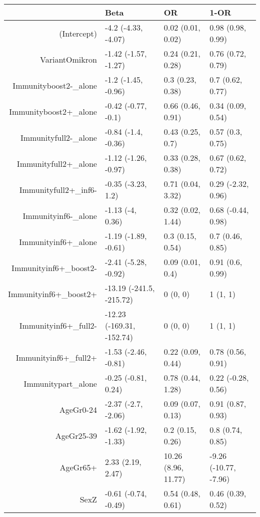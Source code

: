 \begin{table}[ht]
\centering
\begin{tabular}{rlll}
  \hline
 & Beta & OR & 1-OR \\ 
  \hline
(Intercept) & -4.2 (-4.33, -4.07) & 0.02 (0.01, 0.02) & 0.98 (0.98, 0.99) \\ 
  VariantOmikron & -1.42 (-1.57, -1.27) & 0.24 (0.21, 0.28) & 0.76 (0.72, 0.79) \\ 
  Immunityboost2-\_alone & -1.2 (-1.45, -0.96) & 0.3 (0.23, 0.38) & 0.7 (0.62, 0.77) \\ 
  Immunityboost2+\_alone & -0.42 (-0.77, -0.1) & 0.66 (0.46, 0.91) & 0.34 (0.09, 0.54) \\ 
  Immunityfull2-\_alone & -0.84 (-1.4, -0.36) & 0.43 (0.25, 0.7) & 0.57 (0.3, 0.75) \\ 
  Immunityfull2+\_alone & -1.12 (-1.26, -0.97) & 0.33 (0.28, 0.38) & 0.67 (0.62, 0.72) \\ 
  Immunityfull2+\_inf6- & -0.35 (-3.23, 1.2) & 0.71 (0.04, 3.32) & 0.29 (-2.32, 0.96) \\ 
  Immunityinf6-\_alone & -1.13 (-4, 0.36) & 0.32 (0.02, 1.44) & 0.68 (-0.44, 0.98) \\ 
  Immunityinf6+\_alone & -1.19 (-1.89, -0.61) & 0.3 (0.15, 0.54) & 0.7 (0.46, 0.85) \\ 
  Immunityinf6+\_boost2- & -2.41 (-5.28, -0.92) & 0.09 (0.01, 0.4) & 0.91 (0.6, 0.99) \\ 
  Immunityinf6+\_boost2+ & -13.19 (-241.5, -215.72) & 0 (0, 0) & 1 (1, 1) \\ 
  Immunityinf6+\_full2- & -12.23 (-169.31, -152.74) & 0 (0, 0) & 1 (1, 1) \\ 
  Immunityinf6+\_full2+ & -1.53 (-2.46, -0.81) & 0.22 (0.09, 0.44) & 0.78 (0.56, 0.91) \\ 
  Immunitypart\_alone & -0.25 (-0.81, 0.24) & 0.78 (0.44, 1.28) & 0.22 (-0.28, 0.56) \\ 
  AgeGr0-24 & -2.37 (-2.7, -2.06) & 0.09 (0.07, 0.13) & 0.91 (0.87, 0.93) \\ 
  AgeGr25-39 & -1.62 (-1.92, -1.33) & 0.2 (0.15, 0.26) & 0.8 (0.74, 0.85) \\ 
  AgeGr65+ & 2.33 (2.19, 2.47) & 10.26 (8.96, 11.77) & -9.26 (-10.77, -7.96) \\ 
  SexZ & -0.61 (-0.74, -0.49) & 0.54 (0.48, 0.61) & 0.46 (0.39, 0.52) \\ 
   \hline
\end{tabular}
\end{table}
